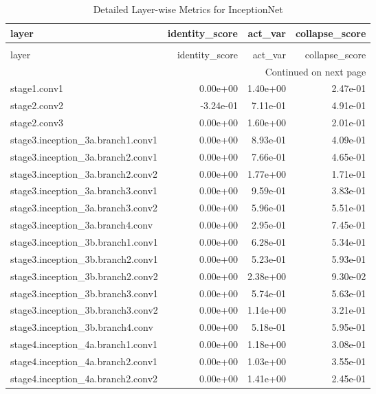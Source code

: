\begin{longtable}{lrrr}
\caption{Detailed Layer-wise Metrics for InceptionNet} \label{tab:layer_metrics_inceptionnet} \\
\toprule
layer & identity_score & act_var & collapse_score \\
\midrule
\endfirsthead
\caption[]{Detailed Layer-wise Metrics for InceptionNet} \\
\toprule
layer & identity_score & act_var & collapse_score \\
\midrule
\endhead
\midrule
\multicolumn{4}{r}{Continued on next page} \\
\midrule
\endfoot
\bottomrule
\endlastfoot
stage1.conv1 & 0.00e+00 & 1.40e+00 & 2.47e-01 \\
stage2.conv2 & -3.24e-01 & 7.11e-01 & 4.91e-01 \\
stage2.conv3 & 0.00e+00 & 1.60e+00 & 2.01e-01 \\
stage3.inception_3a.branch1.conv1 & 0.00e+00 & 8.93e-01 & 4.09e-01 \\
stage3.inception_3a.branch2.conv1 & 0.00e+00 & 7.66e-01 & 4.65e-01 \\
stage3.inception_3a.branch2.conv2 & 0.00e+00 & 1.77e+00 & 1.71e-01 \\
stage3.inception_3a.branch3.conv1 & 0.00e+00 & 9.59e-01 & 3.83e-01 \\
stage3.inception_3a.branch3.conv2 & 0.00e+00 & 5.96e-01 & 5.51e-01 \\
stage3.inception_3a.branch4.conv & 0.00e+00 & 2.95e-01 & 7.45e-01 \\
stage3.inception_3b.branch1.conv1 & 0.00e+00 & 6.28e-01 & 5.34e-01 \\
stage3.inception_3b.branch2.conv1 & 0.00e+00 & 5.23e-01 & 5.93e-01 \\
stage3.inception_3b.branch2.conv2 & 0.00e+00 & 2.38e+00 & 9.30e-02 \\
stage3.inception_3b.branch3.conv1 & 0.00e+00 & 5.74e-01 & 5.63e-01 \\
stage3.inception_3b.branch3.conv2 & 0.00e+00 & 1.14e+00 & 3.21e-01 \\
stage3.inception_3b.branch4.conv & 0.00e+00 & 5.18e-01 & 5.95e-01 \\
stage4.inception_4a.branch1.conv1 & 0.00e+00 & 1.18e+00 & 3.08e-01 \\
stage4.inception_4a.branch2.conv1 & 0.00e+00 & 1.03e+00 & 3.55e-01 \\
stage4.inception_4a.branch2.conv2 & 0.00e+00 & 1.41e+00 & 2.45e-01 \\

\end{longtable}
